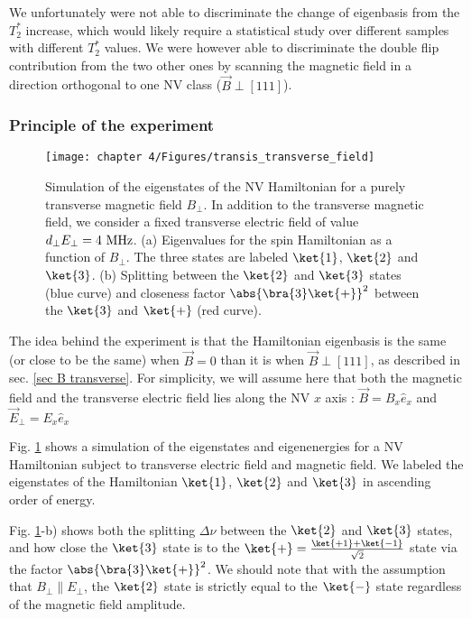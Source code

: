 \documentclass[a4paper, 11pt]{report}
\begin{document}
We unfortunately were not able to discriminate the change of eigenbasis from the $T_2^*$ increase, which would likely require a statistical study over different samples with different $T_2^*$ values. We were however able to discriminate the double flip contribution from the two other ones by scanning the magnetic field in a direction orthogonal to one NV class ($\vec{B} \perp [111]$).

\subsubsection{Principle of the experiment}
\begin{figure}[h]
\centering
\texttt{[image: chapter 4/Figures/transis\_transverse\_field]}
\caption{Simulation of the eigenstates of the NV Hamiltonian for a purely transverse magnetic field $B_\perp$. In addition to the transverse magnetic field, we consider a fixed transverse electric field of value $d_\perp E_\perp=4\ \rm MHz$. (a) Eigenvalues for the spin Hamiltonian as a function of $B_\perp$. The three states are labeled $\ket{1}$, $\ket{2}$ and $\ket{3}$. (b) Splitting between the $\ket{2}$ and $\ket{3}$ states (blue curve) and closeness factor $\abs{\bra{3}\ket{+}}^2$ between the $\ket{3}$ and $\ket{+}$ (red curve).}
\label{eigenstates transverse field}
\end{figure}

The idea behind the experiment is that the Hamiltonian eigenbasis is the same (or close to be the same) when $\vec{B}=0$ than it is when $\vec{B} \perp [111]$, as described in sec. \ref{sec B transverse}. For simplicity, we will assume here that both the magnetic field and the transverse electric field lies along the NV $x$ axis : $\vec{B}=B_x \hat{e}_x$ and $\vec{E}_\perp =E_x \hat{e}_x$

Fig. \ref{eigenstates transverse field} shows a simulation of the eigenstates and eigenenergies for a NV Hamiltonian subject to transverse electric field and magnetic field. We labeled the eigenstates of the Hamiltonian $\ket{1}$, $\ket{2}$ and $\ket{3}$ in ascending order of energy.

Fig. \ref{eigenstates transverse field}-b) shows both the splitting $\Delta \nu$ between the $\ket{2}$ and $\ket{3}$ states, and how close the $\ket{3}$ state is to the $\ket{+}=\frac{\ket{+1}+\ket{-1}}{\sqrt{2}}$ state via the factor $\abs{\bra{3}\ket{+}}^2$. We should note that with the assumption that $B_\perp \parallel E_\perp$, the $\ket{2}$ state is strictly equal to the $\ket{-}$ state regardless of the magnetic field amplitude.
\end{document}
